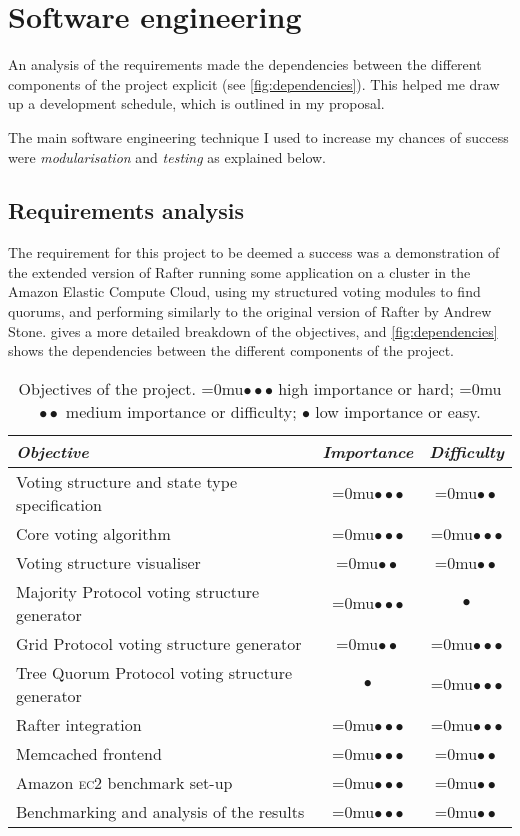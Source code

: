 \documentclass[12pt,chapterprefix=true,toc=bibliography,numbers=noendperiod,
               footnotes=multiple,twoside]{scrreprt}
\newcommand{\ECC}[0]{\textsc{ec}2 }
\newcommand{\zerospacing}[0]{\medmuskip=0mu}
\newcommand{\high}[0]{{\color{purple!90}\zerospacing \(\bullet \bullet \bullet\)} }
\newcommand{\hard}[0]{{\color{purple!90}\zerospacing \(\bullet \bullet \bullet\)} }
\newcommand{\medium}[0]{{\color{violet!80}\zerospacing \(\bullet \bullet\)} }
\newcommand{\easy}[0]{{\color{teal!80}\(\bullet\)} }
\newcommand{\low}[0]{{\color{teal!80}\(\bullet\)} }
\begin{document}
\section{Software engineering}
\label{sc:software-engineering}

An analysis of the requirements made the dependencies between the different components of the project explicit (see \cref{fig:dependencies}). This helped me draw up a development schedule, which is outlined in my proposal.

The main software engineering technique I used to increase my chances of success were \emph{modularisation} and \emph{testing} as explained below.

\subsection{Requirements analysis}
\label{sc:requirements-analysis}

The requirement for this project to be deemed a success was a demonstration of the extended version of Rafter running some application on a cluster in the Amazon Elastic Compute Cloud, using my structured voting modules to find quorums, and performing similarly to the original version of Rafter by Andrew Stone.  gives a more detailed breakdown of the objectives, and \cref{fig:dependencies} shows the dependencies between the different components of the project.

\begin{table}[h]
    \centering
    \begin{tabularx}{\textwidth}{X c c}
        \toprule
        \textit{Objective} & \textit{Importance} & \textit{Difficulty} \\
        \midrule
        Voting structure and state type specification & \high & \medium \\
        Core voting algorithm & \high & \hard \\
        Voting structure visualiser & \medium & \medium \\
        Majority Protocol voting structure generator & \high & \easy \\
        Grid Protocol voting structure generator & \medium & \hard \\
        Tree Quorum Protocol voting structure generator & \low & \hard \\
        Rafter integration & \high & \hard \\
        Memcached frontend & \high & \medium \\
        Amazon \ECC benchmark set-up & \high & \medium \\
        Benchmarking and analysis of the results & \high & \medium \\
        \bottomrule
    \end{tabularx}
    \caption{Objectives of the project. \high high importance or hard; \medium medium importance or difficulty; \low low importance or easy.}
    \label{tab:objectives}
\end{table}
\end{document}

